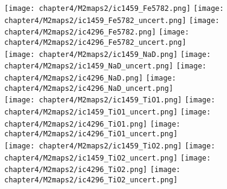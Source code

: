 \begin{figure*}
	\centering
	\texttt{[image: chapter4/M2maps2/ic1459\_Fe5782.png]}
	\texttt{[image: chapter4/M2maps2/ic1459\_Fe5782\_uncert.png]}
	\texttt{[image: chapter4/M2maps2/ic4296\_Fe5782.png]}
	\texttt{[image: chapter4/M2maps2/ic4296\_Fe5782\_uncert.png]}
	\\
	\texttt{[image: chapter4/M2maps2/ic1459\_NaD.png]}
	\texttt{[image: chapter4/M2maps2/ic1459\_NaD\_uncert.png]}
	\texttt{[image: chapter4/M2maps2/ic4296\_NaD.png]}
	\texttt{[image: chapter4/M2maps2/ic4296\_NaD\_uncert.png]}
	\\
	\texttt{[image: chapter4/M2maps2/ic1459\_TiO1.png]}
	\texttt{[image: chapter4/M2maps2/ic1459\_TiO1\_uncert.png]}
	\texttt{[image: chapter4/M2maps2/ic4296\_TiO1.png]}
	\texttt{[image: chapter4/M2maps2/ic4296\_TiO1\_uncert.png]}
	\\
	\texttt{[image: chapter4/M2maps2/ic1459\_TiO2.png]}
	\texttt{[image: chapter4/M2maps2/ic1459\_TiO2\_uncert.png]}
	\texttt{[image: chapter4/M2maps2/ic4296\_TiO2.png]}
	\texttt{[image: chapter4/M2maps2/ic4296\_TiO2\_uncert.png]}
	\\
	\label{fig:MUSE_stellar1}
\end{figure*}

